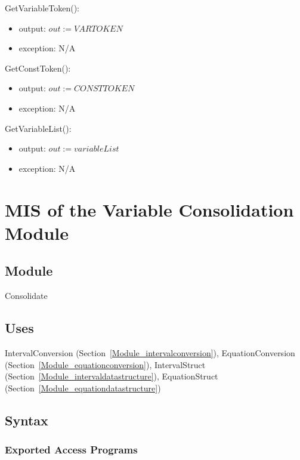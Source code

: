 \documentclass[12pt, titlepage]{article}
\begin{document}
\noindent GetVariableToken():
\begin{itemize}
	\item output: $out := VARTOKEN$
	\item exception: N/A
\end{itemize}

\noindent GetConstToken():
\begin{itemize}
	\item output: $out := CONSTTOKEN$
	\item exception: N/A
\end{itemize}

\noindent GetVariableList():
\begin{itemize}
	\item output: $out := variableList$
	\item exception: N/A
\end{itemize}

\newpage

\section{MIS of the Variable Consolidation Module} 
\label{Module_variableconsolidation}

\subsection{Module}

Consolidate

\subsection{Uses}

IntervalConversion (Section~\ref{Module_intervalconversion}), 
EquationConversion (Section~\ref{Module_equationconversion}), IntervalStruct 
(Section~\ref{Module_intervaldatastructure}), EquationStruct 
(Section~\ref{Module_equationdatastructure})


\subsection{Syntax}

\subsubsection{Exported Access Programs}
\end{document}
